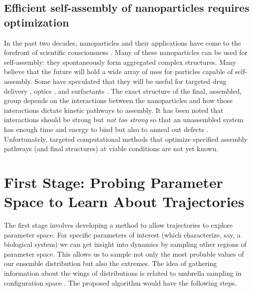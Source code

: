 \documentclass[11pt]{article}
\begin{document}
\subsection*{Efficient self-assembly of nanoparticles requires optimization}
In the past two decades, nanoparticles and their applications have come to the forefront of scientific consciousness \cite{Glotzer2007}.  Many of these nanoparticles can be used for self-assembly: they spontaneously form aggregated complex structures.  Many believe that the future will hold a wide array of uses for particles capable of self-assembly.  Some have speculated that they will be useful for targeted drug delivery \cite{Rosler2001}, optics \cite{Jiang2007}, and surfactants \cite{Glotzer2007}.  The exact structure of the final, assembled, group depends on the interactions between the nanoparticles and how those interactions dictate kinetic pathways to assembly. It has been noted that interactions should be strong but {\it not too strong} so that an unassembled system has enough time and energy to bind but also to anneal out defects \cite{Hagan2006, Whitelam2008}.  Unfortunately, targeted computational methods that optimize specified assembly pathways (and final structures) at viable conditions are not yet known. 





\section*{First Stage: Probing Parameter Space to Learn About Trajectories}

The first stage involves developing a method to allow trajectories to explore parameter space. For specific parameters of interest (which characterize, say, a biological system) we can get insight into dynamics by sampling other regions of parameter space.  This allows us to sample not only the most probable values of our ensemble distribution but also the extremes.  The idea of gathering information about the wings of distributions is related to umbrella sampling in configuration space \cite{IMSM}.  The proposed algorithm would have the following steps.
\end{document}
